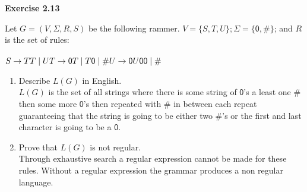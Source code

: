 \documentclass{article}
\makeatletter
\newcommand\exercise[1]{\par\vspace{4ex}\normalfont\normalsize\noindent
\textbf{\large Exercise #1}\par\nobreak\@afterindentfalse\@afterheading}
\makeatother
\begin{document}
\exercise{2.13}
Let $G = (V, \Sigma, R, S)$ be the following rammer. $V = \{ S, T, U\}; \Sigma = \{\textsf{0}, \textsf{\#}\}$; and $R$ is the set of rules: \\ \\
$S \rightarrow TT \mid U \\
T \rightarrow \textsf{0}T \mid T\textsf{0} \mid \textsf{\#} \\
U \rightarrow \textsf{0}U\textsf{00} \mid \textsf{\#}$\\
\begin{enumerate}
	\item Describe $L(G)$ in English.\\
	$L(G)$ is the set of all strings where there is some string of $\textsf{0}$'s a least one \# then some more $\textsf{0}$'s then repeated with \# in between each repeat guaranteeing that the string is going to be either two \#'s or the first and last character is going to be a $\textsf{0}$.
	\item Prove that $L(G)$ is not regular.\\
	Through exhaustive search a regular expression cannot be made for these rules. Without a regular expression the grammar produces a non regular language.
\end{enumerate}

\cleardoublepage
\end{document}

